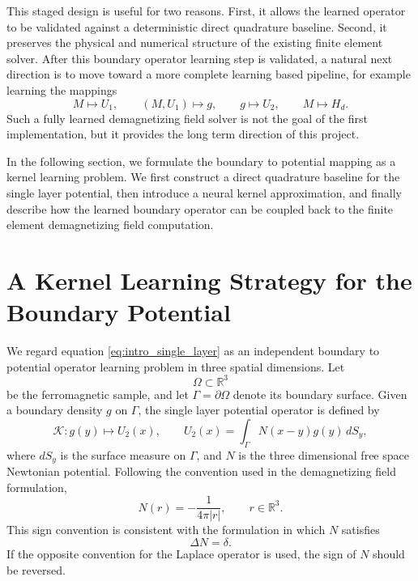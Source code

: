 \documentclass[11pt]{article}
\numberwithin{equation}{section}
\begin{document}
This staged design is useful for two reasons. First, it allows the learned operator to be validated against a deterministic direct quadrature baseline. Second, it preserves the physical and numerical structure of the existing finite element solver. After this boundary operator learning step is validated, a natural next direction is to move toward a more complete learning based pipeline, for example learning the mappings
\begin{equation}
    M \mapsto U_1,
    \qquad
    (M,U_1) \mapsto g,
    \qquad
    g \mapsto U_2,
    \qquad
    M \mapsto H_d.
\end{equation}
Such a fully learned demagnetizing field solver is not the goal of the first implementation, but it provides the long term direction of this project.

In the following section, we formulate the boundary to potential mapping as a kernel learning problem. We first construct a direct quadrature baseline for the single layer potential, then introduce a neural kernel approximation, and finally describe how the learned boundary operator can be coupled back to the finite element demagnetizing field computation.

\section{A Kernel Learning Strategy for the Boundary Potential}

We regard equation \eqref{eq:intro_single_layer} as an independent boundary to potential operator learning problem in three spatial dimensions. Let
\begin{equation}
    \Omega \subset \mathbb{R}^3
\end{equation}
be the ferromagnetic sample, and let \(\Gamma=\partial\Omega\) denote its boundary surface. Given a boundary density \(g\) on \(\Gamma\), the single layer potential operator is defined by
\begin{equation}
    \mathcal{K}: g(y) \mapsto U_2(x),
    \qquad
    U_2(x) = \int_{\Gamma} N(x-y) g(y)\, dS_y,
    \label{eq:boundary_operator}
\end{equation}
where \(dS_y\) is the surface measure on \(\Gamma\), and \(N\) is the three dimensional free space Newtonian potential. Following the convention used in the demagnetizing field formulation,
\begin{equation}
    N(r) = -\frac{1}{4\pi |r|},
    \qquad r \in \mathbb{R}^3.
    \label{eq:newtonian_3d}
\end{equation}
This sign convention is consistent with the formulation in which \(N\) satisfies
\begin{equation}
    \Delta N = \delta.
\end{equation}
If the opposite convention for the Laplace operator is used, the sign of \(N\) should be reversed.
\end{document}
